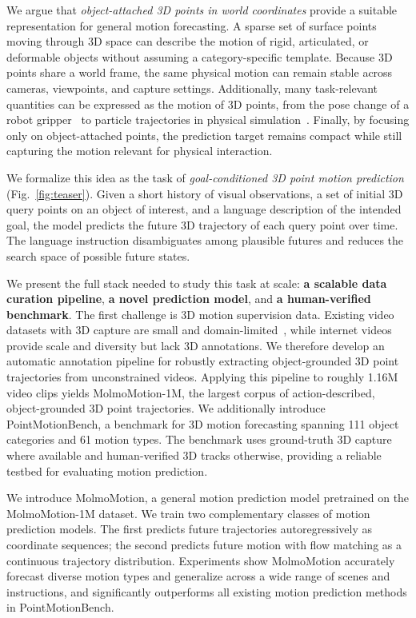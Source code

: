 \documentclass{llmxive}
\providecommand{\modelname}{MolmoMotion\xspace}
\providecommand{\benchmarkname}{PointMotionBench\xspace}
\begin{document}
We argue that \textit{object-attached 3D points in world coordinates} provide a suitable representation for general motion forecasting. A sparse set of surface points moving through 3D space can describe the motion of rigid, articulated, or deformable objects without assuming a category-specific template. Because 3D points share a world frame, the same physical motion can remain stable across cameras, viewpoints, and capture settings. Additionally, many task-relevant quantities can be expressed as the motion of 3D points, from the pose change of a robot gripper~\cite{vidbot} to particle trajectories in physical simulation~\cite{li2018particledynamics, sanchez2020graphnetworksimulators}. 
Finally, by focusing only on object-attached points, the prediction target remains compact while still capturing the motion relevant for physical interaction.

We formalize this idea as the task of \textit{goal-conditioned 3D point motion prediction} (Fig.~\ref{fig:teaser}). Given a short history of visual observations, a set of initial 3D query points on an object of interest, and a language description of the intended goal, the model predicts the future 3D trajectory of each query point over time. The language instruction disambiguates among plausible futures and reduces the search space of possible future states.


We present the full stack needed to study this task at scale: \textbf{a scalable data curation pipeline}, \textbf{a novel prediction model}, and \textbf{a human-verified benchmark}. The first challenge is 3D motion supervision data. Existing video datasets with 3D capture are small and domain-limited~\cite{hot3d, koppula2024tapvid3d, liu2022hoi4d}, while internet videos provide scale and diversity but lack 3D annotations. We therefore develop an automatic annotation pipeline for robustly extracting object-grounded 3D point trajectories from unconstrained videos. Applying this pipeline to roughly 1.16M video clips yields MolmoMotion-1M, the largest corpus of action-described, object-grounded 3D point trajectories. We additionally introduce \benchmarkname{}, a benchmark for 3D motion forecasting spanning 111 object categories and 61 motion types. The benchmark uses ground-truth 3D capture where available and human-verified 3D tracks otherwise, providing a reliable testbed for evaluating motion prediction.

We introduce \modelname, a general motion prediction model pretrained on the MolmoMotion-1M dataset. We train two complementary classes of motion prediction models. The first predicts future trajectories autoregressively as coordinate sequences; the second predicts future motion with flow matching as a continuous trajectory distribution. 
Experiments show \modelname accurately forecast diverse motion types and generalize across a wide range of scenes and instructions, and significantly outperforms all existing motion prediction methods in \benchmarkname{}.
\end{document}
